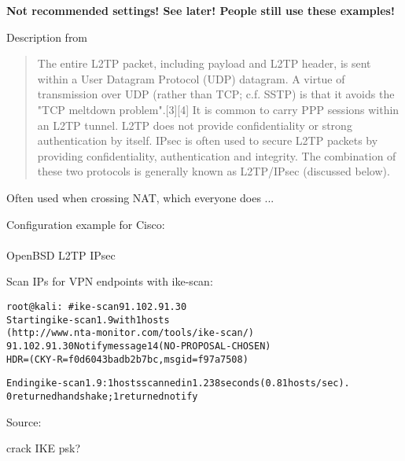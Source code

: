 \documentclass[Screen16to9,17pt]{foils}
\begin{document}
\vskip 1cm
\centerline{\bf Not recommended settings! See later! People still use these examples! {\myalert}}



Description from
\begin{quote}\small
The entire L2TP packet, including payload and L2TP header, is sent within a User Datagram Protocol (UDP) datagram. A virtue of transmission over UDP (rather than TCP; c.f. SSTP) is that it avoids the "TCP meltdown problem".[3][4] It is common to carry PPP sessions within an L2TP tunnel. L2TP does not provide confidentiality or strong authentication by itself. IPsec is often used to secure L2TP packets by providing confidentiality, authentication and integrity. The combination of these two protocols is generally known as L2TP/IPsec (discussed below).
\end{quote}


Often used when crossing NAT, which everyone does ...

Configuration example for Cisco:\\
{\small {}}\\
OpenBSD L2TP IPsec\\
{\small{}}

Scan IPs for VPN endpoints with ike-scan:
\begin{alltt}\small
root@kali:~# ike-scan 91.102.91.30
Starting ike-scan 1.9 with 1 hosts
(http://www.nta-monitor.com/tools/ike-scan/)
91.102.91.30	Notify message 14 (NO-PROPOSAL-CHOSEN)
HDR=(CKY-R=f0d6043badb2b7bc, msgid=f97a7508)

Ending ike-scan 1.9: 1 hosts scanned in 1.238 seconds (0.81 hosts/sec).
0 returned handshake; 1 returned notify
\end{alltt}

Source:\\
{\small{}}

crack IKE psk?\\
{\small
{} \\
}


\end{document}
